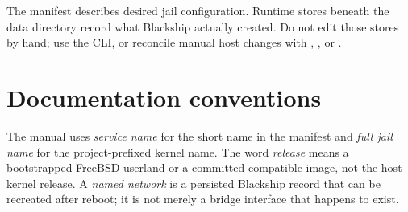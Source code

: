 \begin{shipnote}
The manifest describes desired jail configuration. Runtime stores beneath the
data directory record what Blackship actually created. Do not edit those stores
by hand; use the CLI, or reconcile manual host changes with ,
, or .
\end{shipnote}

\section{Documentation conventions}

The manual uses \emph{service name} for the short name in the manifest and
\emph{full jail name} for the project-prefixed kernel name. The word
\emph{release} means a bootstrapped FreeBSD userland or a committed compatible
image, not the host kernel release. A \emph{named network} is a persisted
Blackship record that can be recreated after reboot; it is not merely a bridge
interface that happens to exist.
